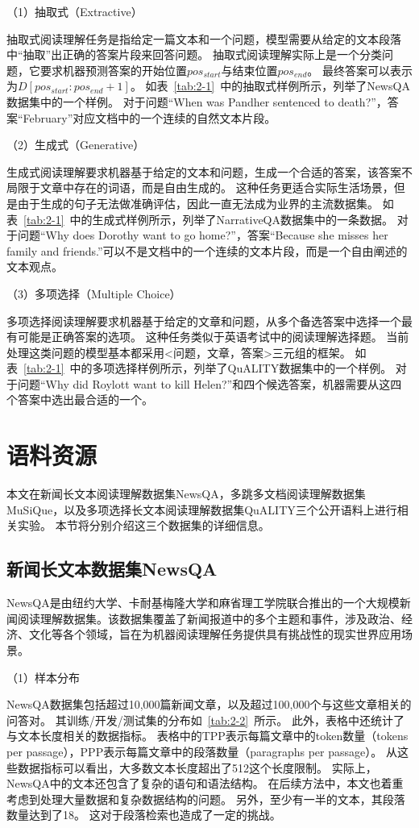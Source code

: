 

（1）抽取式（Extractive）

抽取式阅读理解任务是指给定一篇文本和一个问题，模型需要从给定的文本段落中“抽取”出正确的答案片段来回答问题。
抽取式阅读理解实际上是一个分类问题，它要求机器预测答案的开始位置$pos_{start}$与结束位置$pos_{end}$。
最终答案可以表示为$D[pos_{start}:pos_{end}+1]$。
如表~\ref{tab:2-1}~中的抽取式样例所示，列举了NewsQA数据集中的一个样例。
对于问题“When was Pandher sentenced to death?”，答案“February”对应文档中的一个连续的自然文本片段。

（2）生成式（Generative）

生成式阅读理解要求机器基于给定的文本和问题，生成一个合适的答案，该答案不局限于文章中存在的词语，而是自由生成的。
这种任务更适合实际生活场景，但是由于生成的句子无法做准确评估，因此一直无法成为业界的主流数据集。
如表~\ref{tab:2-1}~中的生成式样例所示，列举了NarrativeQA数据集中的一条数据。
对于问题“Why does Dorothy want to go home?”，答案“Because she misses her family and friends.”可以不是文档中的一个连续的文本片段，而是一个自由阐述的文本观点。

（3）多项选择（Multiple Choice）

多项选择阅读理解要求机器基于给定的文章和问题，从多个备选答案中选择一个最有可能是正确答案的选项。
这种任务类似于英语考试中的阅读理解选择题。
当前处理这类问题的模型基本都采用<问题，文章，答案>三元组的框架。
如表~\ref{tab:2-1}~中的多项选择样例所示，列举了QuALITY数据集中的一个样例。
对于问题“Why did Roylott want to kill Helen?”和四个候选答案，机器需要从这四个答案中选出最合适的一个。


\section{语料资源}
本文在新闻长文本阅读理解数据集NewsQA，多跳多文档阅读理解数据集MuSiQue，以及多项选择长文本阅读理解数据集QuALITY三个公开语料上进行相关实验。
本节将分别介绍这三个数据集的详细信息。

\subsection{新闻长文本数据集NewsQA}
NewsQA是由纽约大学、卡耐基梅隆大学和麻省理工学院联合推出的一个大规模新闻阅读理解数据集。该数据集覆盖了新闻报道中的多个主题和事件，涉及政治、经济、文化等各个领域，旨在为机器阅读理解任务提供具有挑战性的现实世界应用场景。

（1）样本分布

NewsQA数据集包括超过10,000篇新闻文章，以及超过100,000个与这些文章相关的问答对。
其训练/开发/测试集的分布如~\ref{tab:2-2}~所示。
此外，表格中还统计了与文本长度相关的数据指标。
表格中的TPP表示每篇文章中的token数量（tokens per passage），PPP表示每篇文章中的段落数量（paragraphs per passage）。
从这些数据指标可以看出，大多数文本长度超出了512这个长度限制。
实际上，NewsQA中的文本还包含了复杂的语句和语法结构。
在后续方法中，本文也着重考虑到处理大量数据和复杂数据结构的问题。
另外，至少有一半的文本，其段落数量达到了18。
这对于段落检索也造成了一定的挑战。


